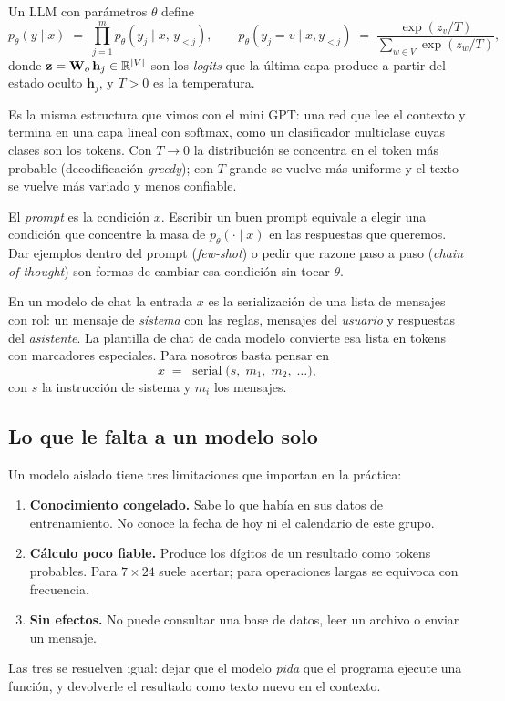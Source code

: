 \documentclass[11pt,letterpaper,oneside]{report}
\begin{document}
\begin{definicion}
Un LLM con parámetros $\theta$ define
\begin{equation}
p_\theta(y \mid x) \;=\; \prod_{j=1}^{m} p_\theta\!\left(y_j \mid x,\, y_{<j}\right),
\qquad
p_\theta\!\left(y_j = v \mid x, y_{<j}\right) \;=\; \frac{\exp(z_v/T)}{\sum_{w\in V}\exp(z_w/T)},
\label{eq:lm}
\end{equation}
donde $\mathbf{z}=\mathbf{W}_o\,\mathbf{h}_j\in\mathbb{R}^{\left\lvert V \right\rvert}$ son los \emph{logits} que la última capa produce a partir del estado oculto $\mathbf{h}_j$, y $T>0$ es la temperatura.
\end{definicion}

Es la misma estructura que vimos con el mini GPT: una red que lee el contexto y termina en una capa lineal con softmax, como un clasificador multiclase cuyas clases son los tokens. Con $T\to 0$ la distribución se concentra en el token más probable (decodificación \emph{greedy}); con $T$ grande se vuelve más uniforme y el texto se vuelve más variado y menos confiable.

\begin{intuicion}
El \emph{prompt} es la condición $x$. Escribir un buen prompt equivale a elegir una condición que concentre la masa de $p_\theta(\cdot\mid x)$ en las respuestas que queremos. Dar ejemplos dentro del prompt (\emph{few-shot}) o pedir que razone paso a paso (\emph{chain of thought}) son formas de cambiar esa condición sin tocar $\theta$.
\end{intuicion}

En un modelo de chat la entrada $x$ es la serialización de una lista de mensajes con rol: un mensaje de \emph{sistema} con las reglas, mensajes del \emph{usuario} y respuestas del \emph{asistente}. La plantilla de chat de cada modelo convierte esa lista en tokens con marcadores especiales. Para nosotros basta pensar en
\[
x \;=\; \operatorname{serial}\bigl(s,\; m_1,\; m_2,\; \dots\bigr),
\]
con $s$ la instrucción de sistema y $m_i$ los mensajes.

\subsection{Lo que le falta a un modelo solo}

Un modelo aislado tiene tres limitaciones que importan en la práctica:
\begin{enumerate}
  \item \textbf{Conocimiento congelado.} Sabe lo que había en sus datos de entrenamiento. No conoce la fecha de hoy ni el calendario de este grupo.
  \item \textbf{Cálculo poco fiable.} Produce los dígitos de un resultado como tokens probables. Para $7\times 24$ suele acertar; para operaciones largas se equivoca con frecuencia.
  \item \textbf{Sin efectos.} No puede consultar una base de datos, leer un archivo o enviar un mensaje.
\end{enumerate}
Las tres se resuelven igual: dejar que el modelo \emph{pida} que el programa ejecute una función, y devolverle el resultado como texto nuevo en el contexto.
\end{document}
